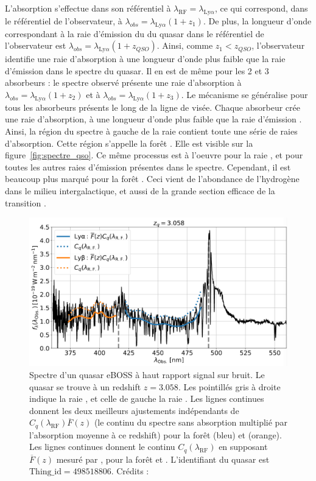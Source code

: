 \documentclass[11pt, twoside, a4paper, openright]{report}
\begin{document}
L'absorption \lya{} s'effectue dans son référentiel à $\lambda_{\mathrm{RF}} = \lambda_{\mathrm{Ly}\alpha}$, ce qui correspond, dans le référentiel de l'observateur, à $\lambda_{obs} = \lambda_{\mathrm{Ly}\alpha} (1+z_{1})$. De plus, la longueur d'onde correspondant à la raie d'émission du \lya{} du quasar dans le référentiel de l'observateur est $\lambda_{obs} = \lambda_{\mathrm{Ly}\alpha} (1+z_{QSO})$. Ainsi, comme $z_1 < z_{QSO}$, l'observateur identifie une raie d'absorption à une longueur d'onde plus faible que la raie d'émission \lya{} dans le spectre du quasar. Il en est de même pour les 2 et 3 absorbeurs : le spectre observé présente une raie d'absorption à $\lambda_{obs} = \lambda_{\mathrm{Ly}\alpha} (1+z_{2})$ et à $\lambda_{obs} = \lambda_{\mathrm{Ly}\alpha} (1+z_{3})$. Le mécanisme se généralise pour tous les absorbeurs présents le long de la ligne de visée. Chaque absorbeur crée une raie d'absorption, à une longueur d'onde plus faible que la raie d'émission \lya{}. Ainsi, la région du spectre à gauche de la raie \lya{} contient toute une série de raies d'absorption. Cette région s'appelle la forêt \lya{}. Elle est visible sur la figure~\ref{fig:spectre_qso}. Ce même processus est à l'oeuvre pour la raie \lyb{}, et pour toutes les autres raies d'émission présentes dans le spectre.
Cependant, il est beaucoup plus marqué pour la forêt \lya{}. Ceci vient de l'abondance de l'hydrogène dans le milieu intergalactique, et aussi de la grande section efficace de la transition \lya{}.
\begin{figure}
  \centering
  \includegraphics[scale=0.35]{foret_lya}
  \caption{Spectre d'un quasar eBOSS à haut rapport signal sur bruit. Le quasar se trouve à un redshift $z=3.058$.
    Les pointillés gris à droite indique la raie \lya{}, et celle de gauche la raie \lyb{}.
    Les lignes continues donnent les deux meilleurs ajustements indépendants de $C_{q}(\lambda_{\mathrm{RF}})\overline F(z)$ (le continu du spectre sans absorption multiplié par l'absorption moyenne à ce redshift) pour la forêt \lya (bleu) et \lyb{} (orange).
    Les lignes continues donnent le continu $C_{q}(\lambda_{\mathrm{RF}})$ en supposant $\overline F(z)$ mesuré par \cite{Calura2012}, pour la forêt \lya{} et \lyb{}. L'identifiant du quasar est $\mathrm{Thing\_id} = 498518806$.
  Crédits : \cite{prov:LyaDR16}}
  \label{fig:foret_lya}
\end{figure}
\end{document}
